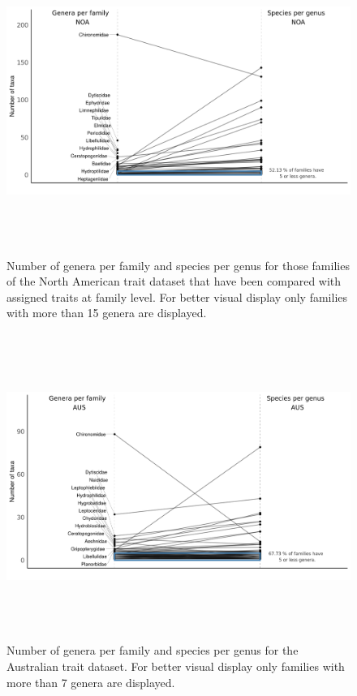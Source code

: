 \documentclass[12pt]{article}
\begin{document}
\begin{figure}[H]
    \centering
    \includegraphics[width=16.5cm, height=10cm]{taxonomic_hierarchy_NOA.png}
    \caption{Number of genera per family and species per genus for those families of the North American trait dataset that have been compared with assigned traits at family level. For better visual display only families with more than 15 genera are displayed.}
    \label{fig:tax_hierarchy_NOA}
\end{figure}

\begin{figure}[H]
    \centering
    \includegraphics[width=16.5cm, height=10cm]{taxonomic_hierarchy_AUS.png}
    \caption{Number of genera per family and species per genus for the Australian trait dataset. For better visual display only families with more than 7 genera are displayed.}
    \label{fig:tax_hierarchy_AUS}
\end{figure}
\end{document}
